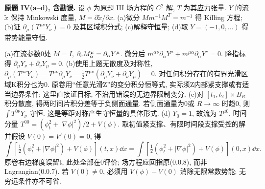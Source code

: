 \begin{exercise}\label{ps:11IV}
\textbf{原题 IV(a--d), 含勘误.} 设 $\phi$ 为原题 III 场方程的 $C^2$ 解, $T$ 为其应力张量. $Y$ 的流 $\widetilde x$ 保持 Minkowski 度量, $M=\partial\widetilde x/\partial x$. (a)微分 $Mm^{-1}M^T=m^{-1}$ 得 Killing 方程; (b)证 $\partial_\mu(T^{\mu\nu}Y_\nu)=0$ 及其区域积分式; (c)解释守恒量; (d)取 $Y=(-1,0,\ldots)$ 得带势能量守恒.
\end{exercise}
\begin{solution}
(a)在流参数0处 $M=I$, $\partial_\varepsilon M^\mu_\alpha=\partial_\alpha Y^\mu$. 微分后
$m^{\alpha\nu}\partial_\alpha Y^\mu+m^{\mu\alpha}\partial_\alpha Y^\nu=0$.
降指标得 $\partial_\mu Y_\nu+\partial_\nu Y_\mu=0$.
(b)使用上题无散度及对称性,
$\partial_\mu(T^{\mu\nu}Y_\nu)=T^{\mu\nu}\partial_\mu Y_\nu=\tfrac12T^{\mu\nu}(\partial_\mu Y_\nu+\partial_\nu Y_\mu)=0$.
对任何积分存在的有界光滑区域K积分也为0. 原卷用“任意光滑Z”的变分积分恒等式, 实际须Z内部紧支撑或有适当边界条件; 这里直接证目标, 不沿用错误的无边界限制变分.
(c)对 $[t_1,t_2]\times B_R$ 积分散度, 得两时间片积分差等于负侧面通量. 若侧面通量为0或 $R\to\infty$ 时趋0, 则 $\int T^{0\nu}Y_\nu$ 守恒. 这是等距对称产生守恒量的具体形式.
(d) $Y_0=1$, 故流为 $T^{\mu0}$, 时间分量 $T^{00}=(\phi_t^2+|\nabla\phi|^2)/2+V(\phi)$. 取初值紧支撑、有限时间段支撑受控的解并假设 $V(0)=V'(0)=0$, 得
\[
\int\left[\tfrac12(\phi_t^2+|\nabla\phi|^2)+V(\phi)\right](t,x)\dd x
=\int\left[\tfrac12(\phi_t^2+|\nabla\phi|^2)+V(\phi)\right](0,x)\dd x.
\]
原卷右边梯度误留t, 此处全部在0评价; 场方程应回指原(0.0.8), 而非 Lagrangian(0.0.7). 若 $V(0)\ne0$, 必须用 $V(\phi)-V(0)$ 消除无限常数势能; 无穷远条件亦不可省.
\end{solution}
